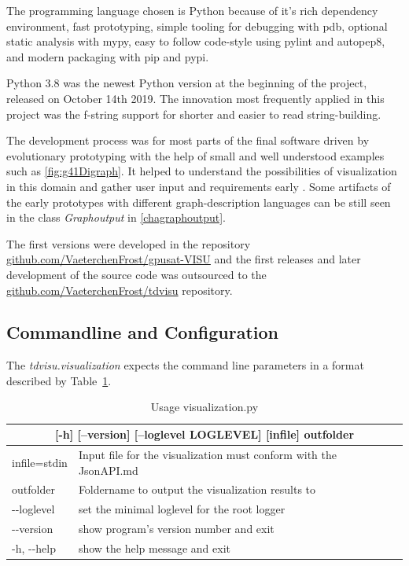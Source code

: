 \documentclass[a4paper, 12pt, bibliography=totoc]{scrartcl}
\begin{document}
The programming language chosen is Python because of it's rich dependency environment, fast prototyping, simple tooling for debugging with pdb, optional static analysis with mypy, easy to follow code-style using pylint and autopep8, and modern packaging with pip and pypi.

Python 3.8 was the newest Python version at the beginning of the project, released on October 14th 2019. The innovation most frequently applied in this project was the f-string support for shorter and easier to read string-building. %

The development process was for most parts of the final software driven by evolutionary prototyping with the help of small and well understood examples such as \ref{fig:g41Digraph}. It helped to understand the possibilities of visualization in this domain and gather user input and requirements early \cite{rapidPrototypingOvermyer}. Some artifacts of the early prototypes with different graph-description languages can be still seen in the class \textit{Graphoutput} in \ref{chagraphoutput}.

The first versions were developed in the repository \url{github.com/VaeterchenFrost/gpusat-VISU} and the first releases and later development of the source code was outsourced to the \url{github.com/VaeterchenFrost/tdvisu} repository.


\subsection{Commandline and Configuration}

The \textit{tdvisu.visualization} expects the command line parameters in a format described by Table~\ref{tab:optionstdvisu}.

\def\arraystretch{1.2}%
\begin{longtable}{|ll|}
	\caption{Usage visualization.py 
		\label{tab:optionstdvisu}}\\
	\hline 
	\multicolumn{2}{|c|}{[-h] [--version] [--loglevel LOGLEVEL] [infile] outfolder}
	\\[2ex]
	\endfirsthead

	infile=stdin &  Input file for the visualization must conform with the JsonAPI.md\\
	outfolder &  Foldername to output the visualization results to\\
	-{}-loglevel  &   set the minimal loglevel for the root logger\\
	-{}-version & show program's version number and exit\\
	-h, -{}-help & show the help message and exit\\
	\hline
\end{longtable}
\end{document}
